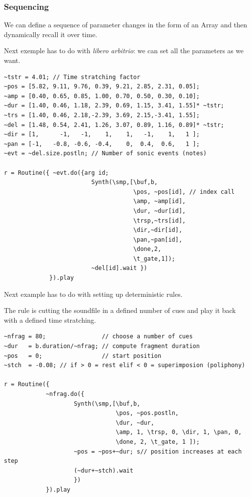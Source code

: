 \subsubsection{Sequencing}\label{sequencing}

We can define a sequence of parameter changes in the form of an Array and then dynamically recall it over time.

Next exemple has to do with \textit{libero arbitrio}: we can set all the parameters as we want.

\begin{lstlisting}[frame=single, caption=Deterministic sequencing] 
~tstr = 4.01; // Time stratching factor
~pos = [5.82, 9.11, 9.76, 0.39, 9.21, 2.85, 2.31, 0.05];       
~amp = [0.40, 0.65, 0.85, 1.00, 0.70, 0.50, 0.30, 0.10];
~dur = [1.40, 0.46, 1.18, 2.39, 0.69, 1.15, 3.41, 1.55]* ~tstr;
~trs = [1.40, 0.46, 2.18,-2.39, 3.69, 2.15,-3.41, 1.55];
~del = [1.48, 0.54, 2.41, 1.26, 3.07, 0.89, 1.16, 0.89]* ~tstr;
~dir = [1,      -1,   -1,    1,    1,   -1,    1,   1 ];
~pan = [-1,   -0.8, -0.6, -0.4,    0,  0.4,  0.6,   1 ];
~evt = ~del.size.postln; // Number of sonic events (notes)

r = Routine({ ~evt.do({arg id;                           
                         Synth(\smp,[\buf,b,
                                     \pos, ~pos[id], // index call
                                     \amp, ~amp[id],
                                     \dur, ~dur[id],
                                     \trsp,~trs[id],
                                     \dir,~dir[id],
                                     \pan,~pan[id],
                                     \done,2,
                                     \t_gate,1]);
		                 ~del[id].wait })
             }).play
\end{lstlisting}

Next example has to do with setting up deterministic rules.

The rule is cutting the soundfile in a defined number of cues and play it back with a defined time stratching.

\begin{lstlisting}[frame=single] 
~nfrag = 80;                // choose a number of cues
~dur   = b.duration/~nfrag; // compute fragment duration
~pos   = 0;                 // start position
~stch  = -0.08; // if > 0 = rest elif < 0 = superimposion (poliphony)

r = Routine({
            ~nfrag.do({
                    Synth(\smp,[\buf,b,
                                \pos, ~pos.postln,
                                \dur, ~dur,
                                \amp, 1, \trsp, 0, \dir, 1, \pan, 0,
                                \done, 2, \t_gate, 1 ]);
                    ~pos = ~pos+~dur; s// position increases at each step
                    (~dur+~stch).wait
	                })
            }).play
\end{lstlisting}

